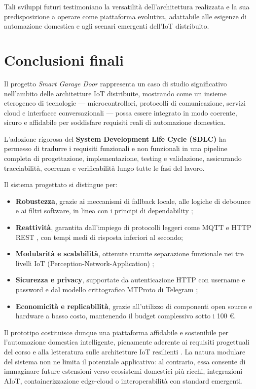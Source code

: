 Tali sviluppi futuri testimoniano la versatilità dell'architettura realizzata e la sua predisposizione a operare come piattaforma evolutiva, adattabile alle esigenze di automazione domestica e agli scenari emergenti dell'IoT distribuito.



\section{Conclusioni finali}
Il progetto \textit{Smart Garage Door} rappresenta un caso di studio significativo nell'ambito delle architetture IoT distribuite, mostrando come un insieme eterogeneo di tecnologie — microcontrollori, protocolli di comunicazione, servizi cloud e interfacce conversazionali — possa essere integrato in modo coerente, sicuro e affidabile per soddisfare requisiti reali di automazione domestica.

L'adozione rigorosa del \textbf{System Development Life Cycle (SDLC)} \cite{Pressman2019} ha permesso di tradurre i requisiti funzionali e non funzionali in una pipeline completa di progettazione, implementazione, testing e validazione, assicurando tracciabilità, coerenza e verificabilità lungo tutte le fasi del lavoro.

Il sistema progettato si distingue per:
\begin{itemize}
    \item \textbf{Robustezza}, grazie ai meccanismi di fallback locale, alle logiche di debounce e ai filtri software, in linea con i principi di dependability \cite{Avizienis2004};
    \item \textbf{Reattività}, garantita dall'impiego di protocolli leggeri come MQTT e HTTP REST \cite{Amaral2018}, con tempi medi di risposta inferiori al secondo;
    \item \textbf{Modularità e scalabilità}, ottenute tramite separazione funzionale nei tre livelli IoT (Perception-Network-Application) \cite{Gubbi2013};
    \item \textbf{Sicurezza e privacy}, supportate da autenticazione HTTP con username e password e dal modello crittografico MTProto di Telegram \cite{Kuznetsov2018};
    \item \textbf{Economicità e replicabilità}, grazie all'utilizzo di componenti open source e hardware a basso costo, mantenendo il budget complessivo sotto i 100 €.
\end{itemize}

Il prototipo costituisce dunque una piattaforma affidabile e sostenibile per l'automazione domestica intelligente, pienamente aderente ai requisiti progettuali del corso e alla letteratura sulle architetture IoT resilienti \cite{Tang2022}. La natura modulare del sistema non ne limita il potenziale applicativo: al contrario, essa consente di immaginare future estensioni verso ecosistemi domestici più ricchi, integrazioni AIoT, containerizzazione edge-cloud o interoperabilità con standard emergenti.

